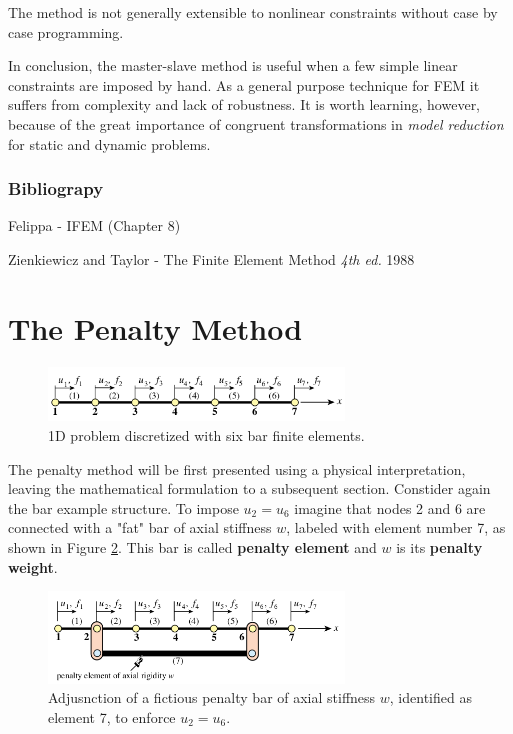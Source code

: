 \documentclass[10pt,b5paper,titlepage]{book}
\begin{document}
The method is not generally extensible to nonlinear constraints without case
by case programming.

In conclusion, the master-slave method is useful when a few simple linear constraints
are imposed by hand. As a general purpose technique for FEM it suffers from
complexity and lack of robustness. It is worth learning, however, because of the
great importance of congruent transformations in
\textit{model reduction} for static and dynamic problems.

\subsubsection{Bibliograpy}

Felippa - IFEM (Chapter 8)

Zienkiewicz and Taylor - The Finite Element Method \textit{4th ed.} 1988


\section{The Penalty Method}

\begin{figure}[ht]
    \centering
    \includegraphics[width=0.70\textwidth]{img/1D_mfc_bar.png}
    \caption{1D problem discretized with six bar finite elements.}
    \label{fig:1D-MFC-bar-png-2}
\end{figure}

The penalty method will be first presented using a physical interpretation,
leaving the mathematical formulation to a subsequent section. Constider again
the bar example structure. To impose $ u_2 = u_6 $ imagine that nodes 2 and 6
are connected with a "fat" bar of axial stiffness $ w $, labeled with element
number 7, as shown in Figure \ref{fig:1D-MFC-bar-penalty-png}. This bar is called \textbf{penalty element} and
$ w $ is its \textbf{penalty weight}.

\begin{figure}[ht]
    \centering
    \includegraphics[width=0.70\textwidth]{img/1D_mfc_bar_penalty.png}
    \caption{Adjusnction of a fictious penalty bar of axial stiffness $ w $,
    identified as element 7, to enforce $ u_2 = u_6 $.}
    \label{fig:1D-MFC-bar-penalty-png}
\end{figure}
\end{document}

